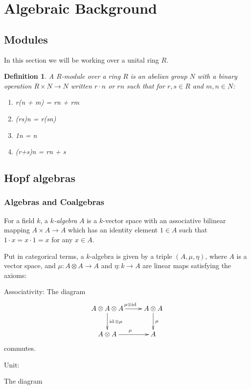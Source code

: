 \documentclass[]{article}
\newtheorem{defn}[theorem]{Definition}
\newcommand{\id}{\operatorname{id}}
\numberwithin{equation}{subsection}
\begin{document}
\tableofcontents
\section{Algebraic Background}
\subsection{Modules}

In  this section we will be working over a unital ring $R$. 
\begin{defn}
    A $R$-\emph{module} over a ring $R$ is an abelian group $N$ with a binary
    operation $R \times N \to N$ written $r\cdot n$ or $rn$ such that for $r,s \in R$ and $m,n \in N$:

    \begin{enumerate}
        \item r(n + m) = rn + rm
        \item (rs)n = r(sn)
        \item 1n = n
        \item (r+s)n = rn + s
    \end{enumerate}
\end{defn}

\subsection{Hopf algebras}
\subsubsection{Algebras and Coalgebras}
For a field $k$, a \emph{$k$-algebra} $A$ is a $k$-vector space with an
associative bilinear mapping $A \times A \to A$ which has an identity element
$1 \in A$ such that $1\cdot x = x\cdot 1 = x$ for any $x \in A$.

Put in categorical terms, a $k$-algebra is given by a triple $(A, \mu, \eta)$,
where $A$ is a vector space, and $\mu: A \otimes A \to A$ and $\eta: k \to A$
are linear maps satisfying the axioms:

Associativity:
The diagram
\begin{equation}
\xymatrix{
A \otimes A \otimes A \ar[d]^{\id \otimes \mu} \ar[r]^{\mu \otimes \id} & A \otimes A \ar[d]^{\mu}\\
 A \otimes A \ar[r]^\mu & A 
}
\end{equation}
commutes.

Unit: 

The diagram
\end{document}
